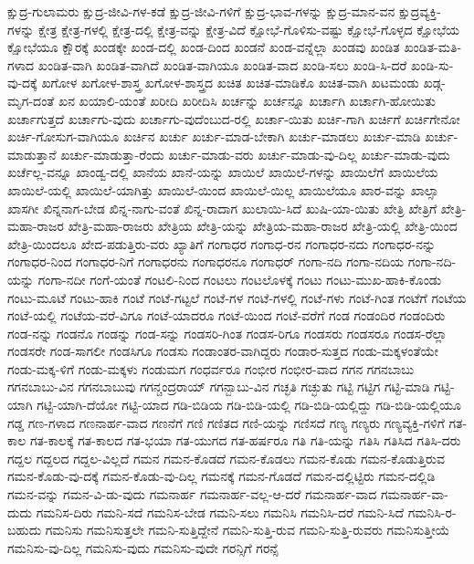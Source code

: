 {ಕ್ಷುದ್ರ-ಗುಲಾಮರು
ಕ್ಷುದ್ರ-ಜೀವಿ-ಗಳ-ಕಡೆ
ಕ್ಷುದ್ರ-ಜೀವಿ-ಗಳಿಗೆ
ಕ್ಷುದ್ರ-ಭಾವ-ಗಳನ್ನು
ಕ್ಷುದ್ರ-ಮಾನ-ವನ
ಕ್ಷುದ್ರವ್ಯಕ್ತಿ-ಗಳನ್ನು
ಕ್ಷೇತ್ರ
ಕ್ಷೇತ್ರ-ಗಳಲ್ಲಿ
ಕ್ಷೇತ್ರ-ದಲ್ಲಿ
ಕ್ಷೇತ್ರ-ವನ್ನು
ಕ್ಷೇತ್ರ-ವಿದೆ
ಕ್ಷೋಭೆ-ಗೊಳಿಸು-ವಷ್ಟು
ಕ್ಷೋಭೆ-ಗೊಳ್ಳದ
ಕ್ಷೋಭೆಯ
ಕ್ಷೋಭೆಯೂ
ಕ್ಷೌರಕ್ಕೆ
ಖಂಡಕ್ಕೇ
ಖಂಡ-ದಲ್ಲಿ
ಖಂಡ-ದಿಂದ
ಖಂಡನೆ
ಖಂಡ-ವನ್ನೆಲ್ಲಾ
ಖಂಡವು
ಖಂಡಿತ
ಖಂಡಿತ-ಮತಿ-ಗಳಾದ
ಖಂಡಿತ-ವಾಗಿ
ಖಂಡಿತ-ವಾಗಿದೆ
ಖಂಡಿತ-ವಾಗಿಯೂ
ಖಂಡಿತ-ವಾದ
ಖಂಡಿ-ಸಲು
ಖಂಡಿ-ಸಿ-ದರೆ
ಖಂಡಿ-ಸು-ವು-ದಕ್ಕೆ
ಖಗೋಳ
ಖಗೋಳ-ಶಾಸ್ತ್ರ
ಖಗೋಳ-ಶಾಸ್ತ್ರದ
ಖಚಿತ
ಖಚಿತ-ಮಾಡಿಕೊ
ಖಚಿತ-ವಾಗಿ
ಖಟಮಂಡು
ಖಡ್ಗ-ಮೃಗ-ದಂತೆ
ಖನ
ಖಯಾಲಿ-ಯಂತೆ
ಖರೀದಿ
ಖರೀದಿಸಿ
ಖರ್ಚನ್ನು
ಖರ್ಚನ್ನೂ
ಖರ್ಚಾಗಿ
ಖರ್ಚಾಗಿ-ಹೋಯಿತು
ಖರ್ಚಾಗುತ್ತದೆ
ಖರ್ಚಾಗು-ವುದು
ಖರ್ಚಾಗು-ವುದೆಂಬುದ-ರಲ್ಲಿ
ಖರ್ಚಾ-ಯಿತು
ಖರ್ಚಿ-ಗಾಗಿ
ಖರ್ಚಿಗೆ
ಖರ್ಚಿಗೇನೋ
ಖರ್ಚಿ-ಗೋಸುಗ-ವಾಗಿಯೂ
ಖರ್ಚಿನ
ಖರ್ಚು
ಖರ್ಚು-ಮಾಡ-ಬೇಕಾಗಿ
ಖರ್ಚು-ಮಾಡಲು
ಖರ್ಚು-ಮಾಡಿ
ಖರ್ಚು-ಮಾಡುತ್ತಾನೆ
ಖರ್ಚು-ಮಾಡುತ್ತಾ-ರೆಂದು
ಖರ್ಚು-ಮಾಡು-ವರು
ಖರ್ಚು-ಮಾಡು-ವು-ದಿಲ್ಲ
ಖರ್ಚು-ಮಾಡು-ವುದು
ಖರ್ಚೆಲ್ಲ-ವನ್ನೂ
ಖಾಂಡ್ವ-ದಲ್ಲಿ
ಖಾನೆಯ
ಖಾನೆ-ಯನ್ನು
ಖಾಯಿಲೆ
ಖಾಯಿಲೆ-ಗಳನ್ನು
ಖಾಯಿಲೆಗೆ
ಖಾಯಿಲೆಯ
ಖಾಯಿಲೆ-ಯಲ್ಲಿ
ಖಾಯಿಲೆ-ಯಾಗಿತ್ತು
ಖಾಯಿಲೆ-ಯಿಂದ
ಖಾಯಿಲೆ-ಯಿಲ್ಲ
ಖಾಯಿಲೆಯೂ
ಖಾರ-ವನ್ನು
ಖಾಲ್ಸಾ
ಖಾಸಗೀ
ಖಿನ್ನನಾಗ-ಬೇಡ
ಖಿನ್ನ-ನಾಗು-ವಂತೆ
ಖಿನ್ನ-ರಾದಾಗ
ಖುಲಾಯಿ-ಸಿದೆ
ಖುಷಿ-ಯಾ-ಯಿತು
ಖೇತ್ರಿ
ಖೇತ್ರಿಗೆ
ಖೇತ್ರಿ-ಮಹಾ-ರಾಜರ
ಖೇತ್ರಿ-ಮಹಾ-ರಾಜರು
ಖೇತ್ರಿಯ
ಖೇತ್ರಿ-ಯನ್ನು
ಖೇತ್ರಿಯ-ಮಹಾ-ರಾಜರ
ಖೇತ್ರಿ-ಯಲ್ಲಿ
ಖೇತ್ರಿ-ಯಿಂದ
ಖೇತ್ರಿ-ಯಿಂದಲೂ
ಖೇದ-ಪಡುತ್ತಿರು-ವರು
ಖ್ಯಾತಿಗೆ
ಗಂಗಾಧರ
ಗಂಗಾಧ-ರನ
ಗಂಗಾಧರ-ನದು
ಗಂಗಾಧರ-ನನ್ನು
ಗಂಗಾಧರ-ನಿಂದ
ಗಂಗಾಧರ-ನಿಗೆ
ಗಂಗಾಧರನು
ಗಂಗಾಧರನೂ
ಗಂಗಾಧರ್
ಗಂಗಾ-ನದಿ
ಗಂಗಾ-ನದಿಯ
ಗಂಗಾ-ನದಿ-ಯನ್ನು
ಗಂಗಾ-ನದೀ
ಗಂಗೆ-ಯಂತೆ
ಗಂಟಲಿ-ನಿಂದ
ಗಂಟಲು
ಗಂಟಲೊಳಕ್ಕೆ
ಗಂಟು
ಗಂಟು-ಮುಖ-ಹಾಕಿ-ಕೊಂಡು
ಗಂಟು-ಮೂಟೆ
ಗಂಟು-ಹಾಕಿ
ಗಂಟೆ
ಗಂಟೆ-ಗಟ್ಟಲೆ
ಗಂಟೆ-ಗಳ
ಗಂಟೆ-ಗಳಲ್ಲಿ
ಗಂಟೆ-ಗಳು
ಗಂಟೆ-ಗಿಂತ
ಗಂಟೆಗೆ
ಗಂಟೆಯ
ಗಂಟೆ-ಯಲ್ಲಿ
ಗಂಟೆಯ-ವರೆ-ವಿಗೂ
ಗಂಟೆ-ಯಾದರೂ
ಗಂಟೆ-ಯಿಂದ
ಗಂಟೆ-ವರೆಗೆ
ಗಂಡ
ಗಂಡಂದಿರ
ಗಂಡಂದಿರು
ಗಂಡ-ನನ್ನು
ಗಂಡನೊ
ಗಂಡನ್ನು
ಗಂಡ-ಸನ್ನು
ಗಂಡಸರಿ-ಗಿಂತ
ಗಂಡಸ-ರಿಗೂ
ಗಂಡಸರು
ಗಂಡಸರೂ
ಗಂಡಸ-ರೆಲ್ಲಾ
ಗಂಡಸರೇ
ಗಂಡ-ಸಾಗಲೀ
ಗಂಡಸಿಗೂ
ಗಂಡಸು
ಗಂಡಾಂತರ-ವಾಗಿದ್ದರು
ಗಂಡಾರ-ಸುತ್ತದ
ಗಂಡು-ಮಕ್ಕಳಂತೆಯೇ
ಗಂಡು-ಮಕ್ಕ-ಳಿಗೆ
ಗಂಡು-ಮಕ್ಕಳು
ಗಂಡುಮಗ
ಗಂಧರ್ವರೂ
ಗಂಭೀರ
ಗಂಭೀರ-ವಾದ
ಗಗನ
ಗಗನಬಾಬು
ಗಗನಬಾಬು-ವಿನ
ಗಗನಬಾಬುವು
ಗಗನ್ಚಂದ್ರರಾಯ್
ಗಗನ್ಬಾಬು-ವಿನ
ಗಚ್ಛತಿ
ಗಚ್ಛುತು
ಗಟ್ಟಿ
ಗಟ್ಟಿಗ
ಗಟ್ಟಿ-ಮಾಡಿ
ಗಟ್ಟಿ-ಯಾಗಿ
ಗಟ್ಟಿ-ಯಾಗಿ-ದೆಯೋ
ಗಟ್ಟಿ-ಯಾದ
ಗಡಿ-ಬಿಡಿಯ
ಗಡಿ-ಬಿಡಿ-ಯಲ್ಲಿ
ಗಡಿ-ಬಿಡಿ-ಯಲ್ಲಿದ್ದು
ಗಡಿ-ಬಿಡಿ-ಯಲ್ಲಿಯೂ
ಗಡ್ಡ
ಗಣ-ಗಳಾದ
ಗಣನಾರ್ಹ-ವಾದ
ಗಣನೆಗೆ
ಗಣಿ
ಗಣಿತದ
ಗಣಿ-ಯನ್ನು
ಗಣಿಸದೆ
ಗಣ್ಯ
ಗಣ್ಯರು
ಗಣ್ಯವ್ಯಕ್ತಿ-ಗಳಿಗೆ
ಗತ-ಕಾಲ
ಗತ-ಕಾಲಕ್ಕೆ
ಗತ-ಕಾಲದ
ಗತ-ಭಯಾ
ಗತ-ಯುಗದ
ಗತ-ಹರ್ಷರೂ
ಗತಿ
ಗತಿ-ಯನ್ನು
ಗತಿಸಿ
ಗತಿಸಿದ
ಗತಿಸಿ-ದರು
ಗದ್ದಲ
ಗದ್ದಲದ
ಗದ್ದಲ-ವಿಲ್ಲದೆ
ಗಮನ
ಗಮನ-ಕೊಡದೆ
ಗಮನ-ಕೊಡಲು
ಗಮನ-ಕೊಡು
ಗಮನ-ಕೊಡುತ್ತಿರುವ
ಗಮನ-ಕೊಡು-ವು-ದಕ್ಕೆ
ಗಮನ-ಕೊಡು-ವು-ದಿಲ್ಲ
ಗಮನಕ್ಕೆ
ಗಮನ-ಗೊಡದೆ
ಗಮನ-ದಲ್ಲಿಟ್ಟಿರು
ಗಮನ-ದಲ್ಲಿಡಿ
ಗಮನ-ವನ್ನು
ಗಮನ-ವಿ-ಡು-ವುದು
ಗಮನಾರ್ಹ
ಗಮನಾರ್ಹ-ವಲ್ಲ-ಆ-ದರೆ
ಗಮನಾರ್ಹ-ವಾದ
ಗಮನಾರ್ಹ-ವಾ-ದುದು
ಗಮನಿಸ-ದಿರು
ಗಮನಿ-ಸದೆ
ಗಮನಿಸ-ಬೇಡ
ಗಮನಿ-ಸಲು
ಗಮನಿಸಿ
ಗಮನಿಸಿ-ದರೆ
ಗಮನಿ-ಸಿದೆ
ಗಮನಿಸಿ-ರ-ಬಹುದು
ಗಮನಿಸು
ಗಮನಿಸುತ್ತಲೇ
ಗಮನಿ-ಸುತ್ತಿದ್ದೇನೆ
ಗಮನಿ-ಸುತ್ತಿ-ರುವ
ಗಮನಿ-ಸುತ್ತಿ-ರುವರು
ಗಮನಿಸುತ್ತೀಯೆ
ಗಮನಿಸು-ವು-ದಿಲ್ಲ
ಗಮನಿಸು-ವುದು
ಗಮನಿಸು-ವುದೇ
ಗರನ್ಸಿಗೆ
ಗರನ್ಸೆ
}
